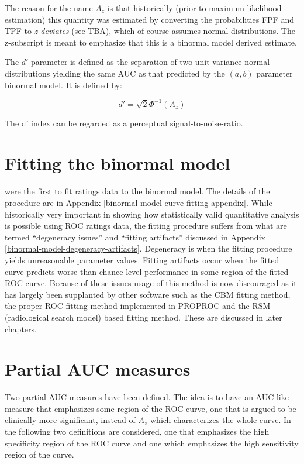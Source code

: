 \documentclass[
]{book}
\begin{document}
The reason for the name \(A_z\) is that historically (prior to maximum likelihood estimation) this quantity was estimated by converting the probabilities FPF and TPF to \emph{z-deviates} (see TBA), which of-course assumes normal distributions. The z-subscript is meant to emphasize that this is a binormal model derived estimate.

The \(d'\) parameter is defined as the separation of two unit-variance normal distributions yielding the same AUC as that predicted by the \((a,b)\) parameter binormal model. It is defined by:

\begin{equation} 
d'=\sqrt{2}\Phi^{-1}\left ( A_z \right )
\label{eq:binormal-model-ab-2dprime}
\end{equation}

The d' index can be regarded as a perceptual signal-to-noise-ratio.

\hypertarget{binormal-model-fitting}{%
\section{Fitting the binormal model}\label{binormal-model-fitting}}

\citep{dorfman1969maximum} were the first to fit ratings data to the binormal model. The details of the procedure are in Appendix \ref{binormal-model-curve-fitting-appendix}. While historically very important in showing how statistically valid quantitative analysis is possible using ROC ratings data, the fitting procedure suffers from what are termed ``degeneracy issues'' and ``fitting artifacts'' discussed in Appendix \ref{binormal-model-degeneracy-artifacts}. Degeneracy is when the fitting procedure yields unreasonable parameter values. Fitting artifacts occur when the fitted curve predicts worse than chance level performance in some region of the fitted ROC curve. Because of these issues usage of this method is now discouraged as it has largely been supplanted by other software such as the CBM fitting method, the proper ROC fitting method implemented in PROPROC and the RSM (radiological search model) based fitting method. These are discussed in later chapters.

\hypertarget{binormal-model-partial-auc}{%
\section{Partial AUC measures}\label{binormal-model-partial-auc}}

Two partial AUC measures have been defined. The idea is to have an AUC-like measure that emphasizes some region of the ROC curve, one that is argued to be clinically more significant, instead of \(A_z\) which characterizes the whole curve. In the following two definitions are considered, one that emphasizes the high specificity region of the ROC curve and one which emphasizes the high sensitivity region of the curve.
\end{document}
